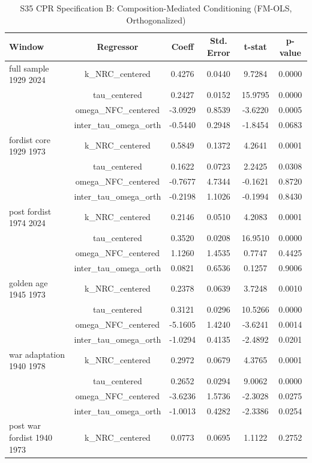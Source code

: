 \begin{table}[htbp]
\centering
\caption{S35 CPR Specification B: Composition-Mediated Conditioning (FM-OLS, Orthogonalized)}
\label{tab:cpr_composition_mediated}
\begin{tabular}{lccccc}
\hline
Window & Regressor & Coeff & Std. Error & t-stat & p-value \\
\hline
full sample 1929 2024 & k\_NRC\_centered & 0.4276 & 0.0440 & 9.7284 & 0.0000 \\
 & tau\_centered & 0.2427 & 0.0152 & 15.9795 & 0.0000 \\
 & omega\_NFC\_centered & -3.0929 & 0.8539 & -3.6220 & 0.0005 \\
 & inter\_tau\_omega\_orth & -0.5440 & 0.2948 & -1.8454 & 0.0683 \\
\hline
fordist core 1929 1973 & k\_NRC\_centered & 0.5849 & 0.1372 & 4.2641 & 0.0001 \\
 & tau\_centered & 0.1622 & 0.0723 & 2.2425 & 0.0308 \\
 & omega\_NFC\_centered & -0.7677 & 4.7344 & -0.1621 & 0.8720 \\
 & inter\_tau\_omega\_orth & -0.2198 & 1.1026 & -0.1994 & 0.8430 \\
\hline
post fordist 1974 2024 & k\_NRC\_centered & 0.2146 & 0.0510 & 4.2083 & 0.0001 \\
 & tau\_centered & 0.3520 & 0.0208 & 16.9510 & 0.0000 \\
 & omega\_NFC\_centered & 1.1260 & 1.4535 & 0.7747 & 0.4425 \\
 & inter\_tau\_omega\_orth & 0.0821 & 0.6536 & 0.1257 & 0.9006 \\
\hline
golden age 1945 1973 & k\_NRC\_centered & 0.2378 & 0.0639 & 3.7248 & 0.0010 \\
 & tau\_centered & 0.3121 & 0.0296 & 10.5266 & 0.0000 \\
 & omega\_NFC\_centered & -5.1605 & 1.4240 & -3.6241 & 0.0014 \\
 & inter\_tau\_omega\_orth & -1.0294 & 0.4135 & -2.4892 & 0.0201 \\
\hline
war adaptation 1940 1978 & k\_NRC\_centered & 0.2972 & 0.0679 & 4.3765 & 0.0001 \\
 & tau\_centered & 0.2652 & 0.0294 & 9.0062 & 0.0000 \\
 & omega\_NFC\_centered & -3.6236 & 1.5736 & -2.3028 & 0.0275 \\
 & inter\_tau\_omega\_orth & -1.0013 & 0.4282 & -2.3386 & 0.0254 \\
\hline
post war fordist 1940 1973 & k\_NRC\_centered & 0.0773 & 0.0695 & 1.1122 & 0.2752 \\

\end{tabular}
\end{table}

